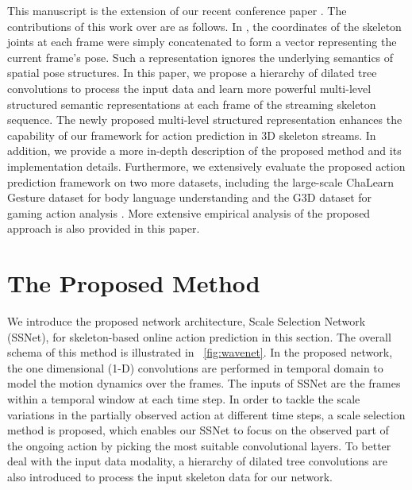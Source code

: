 \documentclass[10pt,twocolumn,letterpaper]{article}
\begin{document}
This manuscript is the extension of our recent conference paper \cite{liu2018ssnet}.
The contributions of this work over \cite{liu2018ssnet} are as follows.
In \cite{liu2018ssnet}, the coordinates of the skeleton joints at each frame were simply concatenated to form a vector representing the current frame's pose.
Such a representation ignores the underlying semantics of spatial pose structures.
In this paper, we propose a hierarchy of dilated tree convolutions to process the input data
and learn more powerful multi-level structured semantic representations at each frame of the streaming skeleton sequence.
The newly proposed multi-level structured representation enhances the capability of our framework for action prediction in 3D skeleton streams.
In addition, we provide a more in-depth description of the proposed method and its implementation details.
Furthermore, we extensively evaluate the proposed action prediction framework on two more datasets,
including the large-scale ChaLearn Gesture dataset for body language understanding \cite{escalera2013multi} and the G3D dataset for gaming action analysis \cite{bloom2012g3d}.
More extensive empirical analysis of the proposed approach is also provided in this paper.





















\section{The Proposed Method}
\label{sec:method}




We introduce the proposed network architecture, Scale Selection Network (SSNet), for skeleton-based online action prediction in this section.
The overall schema of this method is illustrated in \figurename{~\ref{fig:wavenet}}.
In the proposed network, the one dimensional (1-D) convolutions are performed in temporal domain to model the motion dynamics over the frames.
The inputs of SSNet are the frames within a temporal window at each time step.
In order to tackle the scale variations in the partially observed action at different time steps,
a scale selection method is proposed,
which enables our SSNet to focus on the observed part of the ongoing action by picking the most suitable convolutional layers.
To better deal with the input data modality,
a hierarchy of dilated tree convolutions are also introduced to process the input skeleton data for our network.
\end{document}
